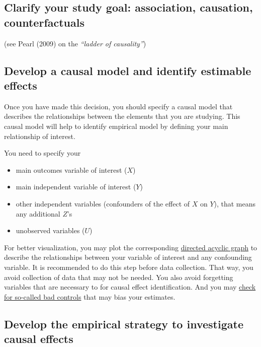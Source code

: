 \documentclass[
]{book}
\providecommand{\tightlist}{%
  \setlength{\itemsep}{0pt}\setlength{\parskip}{0pt}}
\begin{document}
\hypertarget{clarify-your-study-goal-association-causation-counterfactuals}{%
\subsection{Clarify your study goal: association, causation,
counterfactuals}\label{clarify-your-study-goal-association-causation-counterfactuals}}

(see Pearl (2009) on the \emph{``ladder of causality''})

\hypertarget{develop-a-causal-model-and-identify-estimable-effects}{%
\subsection{Develop a causal model and identify estimable
effects}\label{develop-a-causal-model-and-identify-estimable-effects}}

Once you have made this decision, you should specify a causal model that
describes the relationships between the elements that you are studying.
This causal model will help to identify empirical model by defining your
main relationship of interest.

You need to specify your

\begin{itemize}
\tightlist
\item
  main outcomes variable of interest (\(X\))
\item
  main independent variable of interest (\(Y\))
\item
  other independent variables (confounders of the effect of \(X\) on
  \(Y\)), that means any additional \(Z\)'s
\item
  unobserved variables (\(U\))
\end{itemize}

For better visualization, you may plot the corresponding
\href{https://cran.r-project.org/web/packages/ggdag/vignettes/intro-to-dags.html}{directed
acyclic graph} to describe the relationships between your variable of
interest and any confounding variable. It is recommended to do this step
before data collection. That way, you avoid collection of data that may
not be needed. You also avoid forgetting variables that are necessary to
for causal effect identification. And you may
\href{https://ftp.cs.ucla.edu/pub/stat_ser/r493.pdf}{check for so-called
bad controls} that may bias your estimates.

\hypertarget{develop-the-empirical-strategy-to-investigate-causal-effects}{%
\subsection{Develop the empirical strategy to investigate causal
effects}\label{develop-the-empirical-strategy-to-investigate-causal-effects}}
\end{document}
